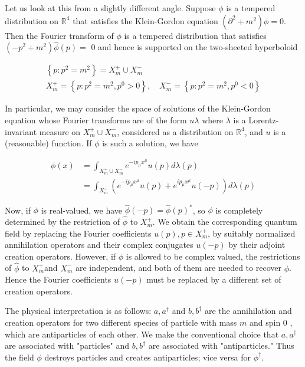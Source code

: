 \documentclass[10pt, letterpaper]{article}
\begin{document}
Let us look at this from a slightly different angle. Suppose $\phi$ is a tempered distribution on $\mathbb{R}^{4}$ that satisfies the Klein-Gordon equation $\left(\partial^{2}+m^{2}\right) \phi=0$. Then the Fourier transform of $\phi$ is a tempered distribution that satisfies $\left(-p^{2}+m^{2}\right) \widehat{\phi}(p)=$ 0 and hence is supported on the two-sheeted hyperboloid

$$
\begin{gathered}
\left\{p: p^{2}=m^{2}\right\}=X_{m}^{+} \cup X_{m}^{-} \\
X_{m}^{+}=\left\{p: p^{2}=m^{2}, p^{0}>0\right\}, \quad X_{m}^{-}=\left\{p: p^{2}=m^{2}, p^{0}<0\right\}
\end{gathered}
$$

In particular, we may consider the space of solutions of the Klein-Gordon equation whose Fourier transforms are of the form $u \lambda$ where $\lambda$ is a Lorentz-invariant measure on $X_{m}^{+} \cup X_{m}^{-}$, considered as a distribution on $\mathbb{R}^{4}$, and $u$ is a (reasonable) function. If $\phi$ is such a solution, we have

$$
\begin{aligned}
\phi(x) & =\int_{X_{m}^{+} \cup X_{m}^{-}} e^{-i p_{\mu} x^{\mu}} u(p) d \lambda(p) \\
& =\int_{X_{m}^{+}}\left(e^{-i p_{\mu} x^{\mu}} u(p)+e^{i p_{\mu} x^{\mu}} u(-p)\right) d \lambda(p)
\end{aligned}
$$

Now, if $\phi$ is real-valued, we have $\widehat{\phi}(-p)=\widehat{\phi}(p)^{*}$, so $\phi$ is completely determined by the restriction of $\widehat{\phi}$ to $X_{m}^{+}$. We obtain the corresponding quantum field by replacing the Fourier coefficients $u(p), p \in X_{m}^{+}$, by suitably normalized annihilation operators and their complex conjugates $u(-p)$ by their adjoint creation operators. However, if $\phi$ is allowed to be complex valued, the restrictions of $\widehat{\phi}$ to $X_{m}^{+}$and $X_{m}^{-}$ are independent, and both of them are needed to recover $\phi$. Hence the Fourier coefficients $u(-p)$ must be replaced by a different set of creation operators.

The physical interpretation is as follows: $a, a^{\dagger}$ and $b, b^{\dagger}$ are the annihilation and creation operators for two different species of particle with mass $m$ and spin 0 , which are antiparticles of each other. We make the conventional choice that $a, a^{\dagger}$ are associated with "particles" and $b, b^{\dagger}$ are associated with "antiparticles." Thus the field $\phi$ destroys particles and creates antiparticles; vice versa for $\phi^{\dagger}$.
\end{document}
